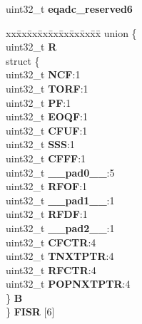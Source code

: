 \begin{DoxyCompactItemize}
\begin{tabbing}
\end{tabbing}\item 
\mbox{\label{structEQADC__tag_a83f8f43d5924a57ed34898e0defe65e3}} 
uint32\+\_\+t {\bfseries eqadc\+\_\+reserved6}
\item 
\mbox{\label{structEQADC__tag_a27021b7f236f6fcec6499c29f8a02b4b}} 
\begin{tabbing}
xx\=xx\=xx\=xx\=xx\=xx\=xx\=xx\=xx\=\kill
union \{\\
\>uint32\_t {\bfseries R}\\
\>struct \{\\
\>\>uint32\_t {\bfseries NCF}:1\\
\>\>uint32\_t {\bfseries TORF}:1\\
\>\>uint32\_t {\bfseries PF}:1\\
\>\>uint32\_t {\bfseries EOQF}:1\\
\>\>uint32\_t {\bfseries CFUF}:1\\
\>\>uint32\_t {\bfseries SSS}:1\\
\>\>uint32\_t {\bfseries CFFF}:1\\
\>\>uint32\_t {\bfseries \_\_pad0\_\_}:5\\
\>\>uint32\_t {\bfseries RFOF}:1\\
\>\>uint32\_t {\bfseries \_\_pad1\_\_}:1\\
\>\>uint32\_t {\bfseries RFDF}:1\\
\>\>uint32\_t {\bfseries \_\_pad2\_\_}:1\\
\>\>uint32\_t {\bfseries CFCTR}:4\\
\>\>uint32\_t {\bfseries TNXTPTR}:4\\
\>\>uint32\_t {\bfseries RFCTR}:4\\
\>\>uint32\_t {\bfseries POPNXTPTR}:4\\
\>\} {\bfseries B}\\
\} {\bfseries FISR} \mbox{[}6\mbox{]}\\


\end{tabbing}
\end{DoxyCompactItemize}
